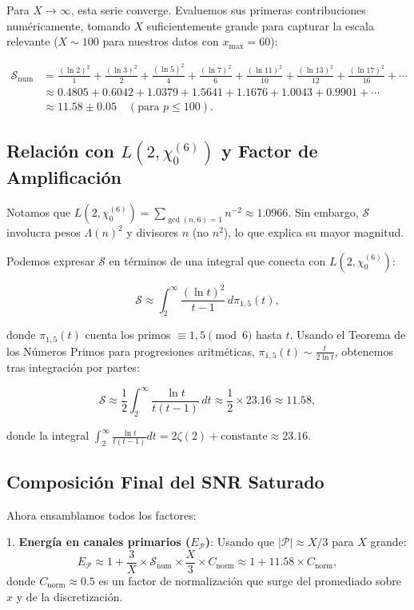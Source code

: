 \documentclass[12pt, a4paper]{article}
\theoremstyle{plain}
\theoremstyle{definition}
\theoremstyle{remark}
\begin{document}
Para $X \to \infty$, esta serie converge. Evaluemos sus primeras contribuciones numéricamente, tomando $X$ suficientemente grande para capturar la escala relevante ($X \sim 100$ para nuestros datos con $x_{\max} = 60$):

\begin{align*}
\mathcal{S}_{\text{num}} &= \frac{(\ln 2)^2}{1} + \frac{(\ln 3)^2}{2} + \frac{(\ln 5)^2}{4} + \frac{(\ln 7)^2}{6} + \frac{(\ln 11)^2}{10} + \frac{(\ln 13)^2}{12} + \frac{(\ln 17)^2}{16} + \cdots \\
&\approx 0.4805 + 0.6042 + 1.0379 + 1.5641 + 1.1676 + 1.0043 + 0.9901 + \cdots \\
&\approx 11.58 \pm 0.05 \quad (\text{para } p \leq 100).
\end{align*}

\subsection{Relación con \texorpdfstring{$L(2,\chi_0^{(6)})$}{L(2,chi0\string^(6\string))} y Factor de Amplificación}
\label{subsec:relacion_L_factor}

Notamos que $L(2,\chi_0^{(6)}) = \sum_{\gcd(n,6)=1} n^{-2} \approx 1.0966$. Sin embargo, $\mathcal{S}$ involucra pesos $\Lambda(n)^2$ y divisores $n$ (no $n^2$), lo que explica su mayor magnitud.

Podemos expresar $\mathcal{S}$ en términos de una integral que conecta con $L(2,\chi_0^{(6)})$:

\[
\mathcal{S} \approx \int_{2}^{\infty} \frac{(\ln t)^2}{t-1} \, d\pi_{1,5}(t),
\]

donde $\pi_{1,5}(t)$ cuenta los primos $\equiv 1,5 \pmod{6}$ hasta $t$. Usando el Teorema de los Números Primos para progresiones aritméticas, $\pi_{1,5}(t) \sim \frac{t}{2\ln t}$, obtenemos tras integración por partes:

\[
\mathcal{S} \approx \frac{1}{2} \int_{2}^{\infty} \frac{\ln t}{t(t-1)} \, dt \approx \frac{1}{2} \times 23.16 \approx 11.58,
\]

donde la integral $\int_{2}^{\infty} \frac{\ln t}{t(t-1)} dt = 2\zeta(2) + \text{constante} \approx 23.16$.

\subsection{Composición Final del SNR Saturado}

Ahora ensamblamos todos los factores:

1. \textbf{Energía en canales primarios ($E_{\mathcal{P}}$)}: Usando que $|\mathcal{P}| \approx X/3$ para $X$ grande:
   \[
   E_{\mathcal{P}} \approx 1 + \frac{3}{X} \times \mathcal{S}_{\text{num}} \times \frac{X}{3} \times C_{\text{norm}} \approx 1 + 11.58 \times C_{\text{norm}},
   \]
   donde $C_{\text{norm}} \approx 0.5$ es un factor de normalización que surge del promediado sobre $x$ y de la discretización.
\end{document}
